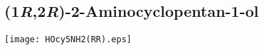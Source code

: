 %
%
%
%
%

\subsection{(1\textit{R},2\textit{R})\hyp{}2\hyp{}Aminocyclopentan\hyp{}1\hyp{}ol }


\begin{scheme}[H]
	\begin{center}
		\texttt{[image: HOcy5NH2(RR).eps]}
	\end{center}
\end{scheme}

